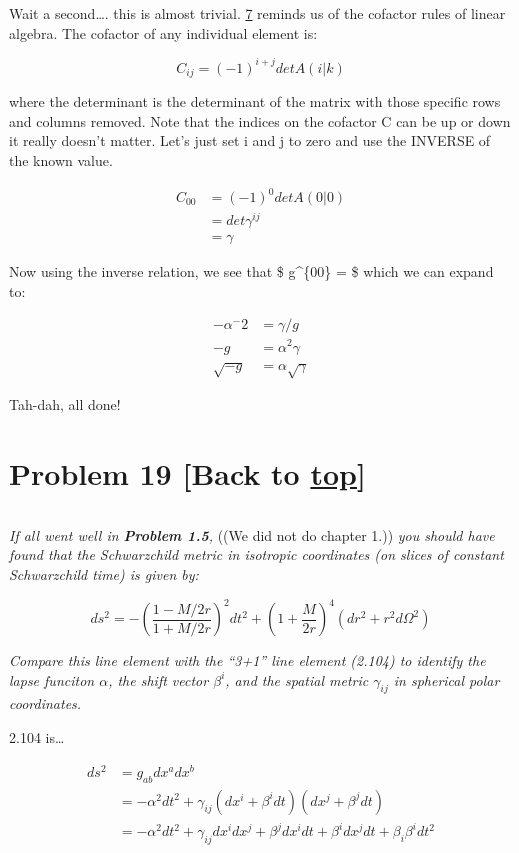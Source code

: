 \documentclass[landscape,letterpaper,10pt,english]{article}
\begin{document}
    Wait a second\ldots. this is almost trivial. \hyperref[7]{7} reminds us
of the cofactor rules of linear algebra. The cofactor of any individual
element is:

\[ C_{ij} = (-1)^{i+j} det A(i|k) \]

where the determinant is the determinant of the matrix with those
specific rows and columns removed. Note that the indices on the cofactor
C can be up or down it really doesn't matter. Let's just set i and j to
zero and use the INVERSE of the known value.

\[ 
\begin{align}
C_{00} &= (-1)^0 det A(0|0) \\
&= det \gamma^{ij} \\
&= \gamma
\end{align}
\]

    Now using the inverse relation, we see that \$ g\^{}\{00\} =
 \$ which we can expand to:

\[
\begin{align}
-\alpha^-2 &= \gamma / g \\
-g &= \alpha^2 \gamma \\
\sqrt{-g} &= \alpha \sqrt{\gamma}
\end{align}
\]

Tah-dah, all done!

    \hypertarget{problem-19-back-to-top}{%
\section{\texorpdfstring{Problem 19 {[}Back to
\hyperref[toc]{top}{]}}{Problem 19 {[}Back to {]}}}\label{problem-19-back-to-top}}

\[\label{P19}\]

\emph{If all went well in \textbf{Problem 1.5},} ((We did not do chapter
1.)) \emph{you should have found that the Schwarzchild metric in
isotropic coordinates (on slices of constant Schwarzchild time) is given
by:}

\[ ds^2 = -\left( \frac{1-M/2r}{1+M/2r} \right)^2 dt^2 + \left( 1 + \frac{M}{2r}\right)^4 (dr^2 + r^2 d\Omega^2) \]

\emph{Compare this line element with the ``3+1'' line element (2.104) to
identify the lapse funciton \(\alpha\), the shift vector \(\beta^i\),
and the spatial metric \(\gamma_{ij}\) in spherical polar coordinates.}

    2.104 is\ldots{}

\[
\begin{align}
ds^2 &= g_{ab}dx^adx^b \\
&= -\alpha^2 dt^2 + \gamma_{ij}(dx^i + \beta^i dt)(dx^j + \beta^j dt) \\
&= -\alpha^2 dt^2 + \gamma_{ij}dx^idx^j + \beta^j dx^i dt + \beta^i dx^j dt + \beta_i\beta^i dt^2 \\
\end{align}
\]
\end{document}
